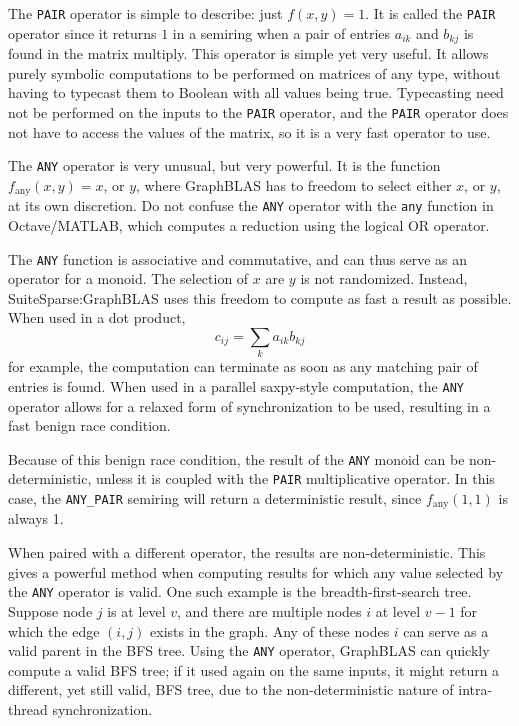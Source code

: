 \documentclass[12pt]{article}
\begin{document}
The \verb'PAIR' operator is simple to describe: just $f(x,y)=1$.  It is called
the \verb'PAIR' operator since it returns $1$ in a semiring when a pair of
entries $a_{ik}$ and $b_{kj}$ is found in the matrix multiply.  This operator
is simple yet very useful.  It allows purely symbolic computations to be
performed on matrices of any type, without having to typecast them to Boolean
with all values being true.  Typecasting need not be performed on the inputs to
the \verb'PAIR' operator, and the \verb'PAIR' operator does not have to access
the values of the matrix, so it is a very fast operator to use.

The \verb'ANY' operator is very unusual, but very powerful.  It is the function
$f_{\mbox{any}}(x,y)=x$, or $y$, where GraphBLAS has to freedom to select
either $x$, or $y$, at its own discretion.  Do not confuse the \verb'ANY'
operator with the \verb'any' function in Octave/MATLAB, which computes a reduction
using the logical OR operator.

The \verb'ANY' function is associative and commutative, and can thus serve as
an operator for a monoid.  The selection of $x$ are $y$ is not randomized.
Instead, SuiteSparse:GraphBLAS uses this freedom to compute as fast a result as
possible.  When used in a dot product, \[ c_{ij} = \sum_k a_{ik} b_{kj} \] for
example, the computation can terminate as soon as any matching pair of entries
is found.  When used in a parallel saxpy-style computation, the \verb'ANY'
operator allows for a relaxed form of synchronization to be used, resulting
in a fast benign race condition.

Because of this benign race condition, the result of the \verb'ANY' monoid can
be non-deterministic, unless it is coupled with the \verb'PAIR' multiplicative
operator.  In this case, the \verb'ANY_PAIR' semiring will return a
deterministic result, since $f_{\mbox{any}}(1,1)$ is always 1.

When paired with a different operator, the results are non-deterministic.  This
gives a powerful method when computing results for which any value selected by
the \verb'ANY' operator is valid.  One such example is the breadth-first-search
tree.  Suppose node $j$ is at level $v$, and there are multiple nodes $i$ at
level $v-1$ for which the edge $(i,j)$ exists in the graph.  Any of these nodes
$i$ can serve as a valid parent in the BFS tree.  Using the \verb'ANY'
operator, GraphBLAS can quickly compute a valid BFS tree; if it used again on
the same inputs, it might return a different, yet still valid, BFS tree, due to
the non-deterministic nature of intra-thread synchronization.
\end{document}
